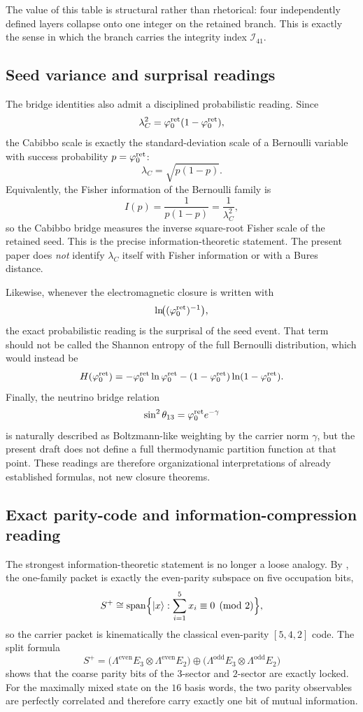 The value of this table is structural rather than rhetorical: four independently defined layers collapse onto one integer on the retained branch. This is exactly the sense in which the branch carries the integrity index $\mathcal I_{41}$.

\subsection{Seed variance and surprisal readings}

The bridge identities also admit a disciplined probabilistic reading. Since
\[
\lambda_C^2=\varphi_0^{\mathrm{ret}}(1-\varphi_0^{\mathrm{ret}}),
\]
the Cabibbo scale is exactly the standard-deviation scale of a Bernoulli variable with success probability $p=\varphi_0^{\mathrm{ret}}$:
\[
\lambda_C=\sqrt{p(1-p)}.
\]
Equivalently, the Fisher information of the Bernoulli family is
\[
I(p)=\frac{1}{p(1-p)}=\frac{1}{\lambda_C^2},
\]
so the Cabibbo bridge measures the inverse square-root Fisher scale of the retained seed. This is the precise information-theoretic statement. The present paper does \emph{not} identify $\lambda_C$ itself with Fisher information or with a Bures distance.

Likewise, whenever the electromagnetic closure is written with
\[
\ln\!\bigl((\varphi_0^{\mathrm{ret}})^{-1}\bigr),
\]
the exact probabilistic reading is the surprisal of the seed event. That term should not be called the Shannon entropy of the full Bernoulli distribution, which would instead be
\[
H(\varphi_0^{\mathrm{ret}})
=
-\varphi_0^{\mathrm{ret}}\ln\varphi_0^{\mathrm{ret}}-(1-\varphi_0^{\mathrm{ret}})\ln(1-\varphi_0^{\mathrm{ret}}).
\]
Finally, the neutrino bridge relation
\[
\sin^2\theta_{13}=\varphi_0^{\mathrm{ret}} e^{-\gamma}
\]
is naturally described as Boltzmann-like weighting by the carrier norm $\gamma$, but the present draft does not define a full thermodynamic partition function at that point. These readings are therefore organizational interpretations of already established formulas, not new closure theorems.

\subsection{Exact parity-code and information-compression reading}

The strongest information-theoretic statement is no longer a loose analogy. By , the one-family packet is exactly the even-parity subspace on five occupation bits,
\[
S^+
\cong
\mathrm{span}\Bigl\{|x\rangle:\sum_{i=1}^5 x_i\equiv 0 \pmod 2\Bigr\},
\]
so the carrier packet is kinematically the classical even-parity $[5,4,2]$ code. The split formula
\[
S^+
=
\bigl(\Lambda^{\mathrm{even}}E_3\otimes\Lambda^{\mathrm{even}}E_2\bigr)
\oplus
\bigl(\Lambda^{\mathrm{odd}}E_3\otimes\Lambda^{\mathrm{odd}}E_2\bigr)
\]
shows that the coarse parity bits of the $3$-sector and $2$-sector are exactly locked. For the maximally mixed state on the $16$ basis words, the two parity observables are perfectly correlated and therefore carry exactly one bit of mutual information.

